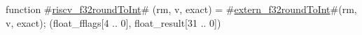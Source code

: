 function #\hyperref[sailRISCVzriscvzyf32roundToInt]{riscv\_f32roundToInt}# (rm, v, exact) = {
  #\hyperref[sailRISCVzexternzyf32roundToInt]{extern\_f32roundToInt}#(rm, v, exact);
  (float_fflags[4 .. 0], float_result[31 .. 0])
}
